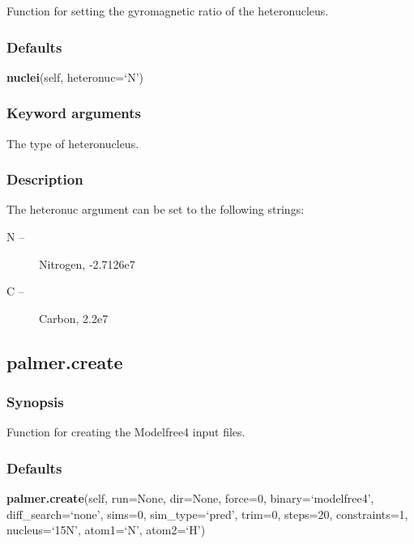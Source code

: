  Function for setting the gyromagnetic ratio of the heteronucleus. 
  

  
 \subsubsection{Defaults} 

 \textsf{\textbf{nuclei}(self, heteronuc=`N')} 

  
 \subsubsection{Keyword arguments} 

   The type of heteronucleus.  

  

  
 \subsubsection{Description} 

 The heteronuc argument can be set to the following strings: 
  

 \begin{description} 
 \item[N --]  Nitrogen, -2.7126e7  
 \item[C --]  Carbon, 2.2e7  
 \end{description} 
  

  

 \newpage 

 \subsection{palmer.create} 

  
 \subsubsection{Synopsis} 

 Function for creating the Modelfree4 input files. 
  

  
 \subsubsection{Defaults} 

 \textsf{\textbf{palmer.create}(self, run=None, dir=None, force=0, binary=`modelfree4', diff\_search=`none', sims=0, sim\_type=`pred', trim=0, steps=20, constraints=1, nucleus=`15N', atom1=`N', atom2=`H')} 

